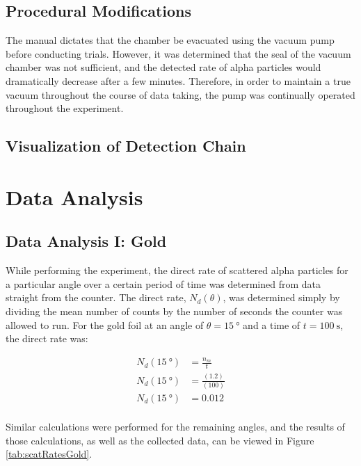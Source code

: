 \documentclass[a4paper]{article}
\begin{document}
\subsection{Procedural Modifications}
\qq The manual dictates that the chamber be evacuated using the vacuum pump
before conducting trials. However, it was determined that the seal of the vacuum
chamber was not sufficient, and the detected rate of alpha particles would
dramatically decrease after a few minutes. Therefore, in order to maintain a
true vacuum throughout the course of data taking, the pump was continually
operated throughout the experiment.  \qq

\subsection{Visualization of Detection Chain}

\section{Data Analysis}

\subsection{Data Analysis I: Gold}

\qq While performing the experiment, the direct rate of scattered alpha
particles for a particular angle over a certain period of time was determined
from data straight from the counter. The direct rate, \( N_d (\theta) \), was
determined simply by dividing the mean number of counts by the number of seconds
the counter was allowed to run. For the gold foil at an angle of
\( \theta = \SI{15}{\degree} \) and a time of \( t = \SI{100}{\second} \), the
direct rate was:

\begin{align*}
  N_d (\SI{15}{\degree}) &= \frac{n_m}{t} \\
  N_d (\SI{15}{\degree}) &= \frac{(1.2)}{(100)} \\
  N_d (\SI{15}{\degree}) &= \num{0.012} \\
\end{align*}

Similar calculations were performed for the remaining angles, and the results of
those calculations, as well as the collected data, can be viewed in Figure
\ref{tab:scatRatesGold}.
\end{document}
